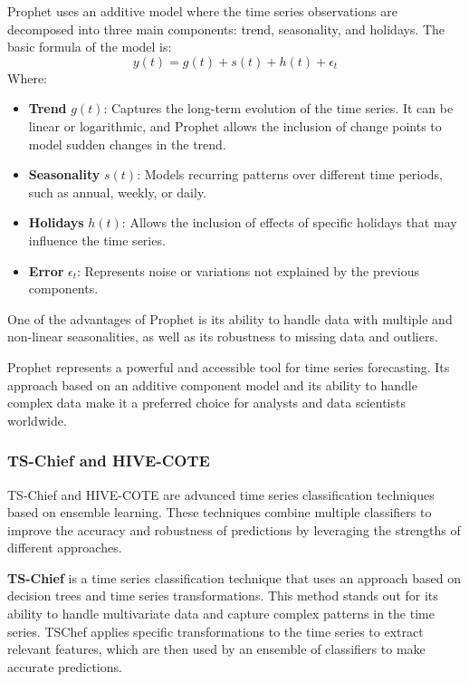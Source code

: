 Prophet uses an additive model where the time series observations are decomposed into three main components: trend, seasonality, and holidays. The basic formula of the model is:
\begin{equation}
y(t) = g(t) + s(t) + h(t) + \epsilon_t
\end{equation}
Where:
\begin{itemize}
    \item \textbf{Trend} \(g(t)\): Captures the long-term evolution of the time series. It can be linear or logarithmic, and Prophet allows the inclusion of change points to model sudden changes in the trend.
    \item \textbf{Seasonality} \(s(t)\): Models recurring patterns over different time periods, such as annual, weekly, or daily.
    \item \textbf{Holidays} \(h(t)\): Allows the inclusion of effects of specific holidays that may influence the time series.
    \item \textbf{Error} \(\epsilon_t\): Represents noise or variations not explained by the previous components.
\end{itemize}

One of the advantages of Prophet is its ability to handle data with multiple and non-linear seasonalities, as well as its robustness to missing data and outliers.

Prophet represents a powerful and accessible tool for time series forecasting. Its approach based on an additive component model and its ability to handle complex data make it a preferred choice for analysts and data scientists worldwide.
\vspace{10pt}

\subsubsection{TS-Chief and HIVE-COTE}
TS-Chief\cite{Shifaz_2020} and HIVE-COTE\cite{7837946} are advanced time series classification techniques based on ensemble learning. These techniques combine multiple classifiers to improve the accuracy and robustness of predictions by leveraging the strengths of different approaches.
\vspace{10pt}

\textbf{TS-Chief} is a time series classification technique that uses an approach based on decision trees and time series transformations. This method stands out for its ability to handle multivariate data and capture complex patterns in the time series. TSChef applies specific transformations to the time series to extract relevant features, which are then used by an ensemble of classifiers to make accurate predictions.
\vspace{10pt}

